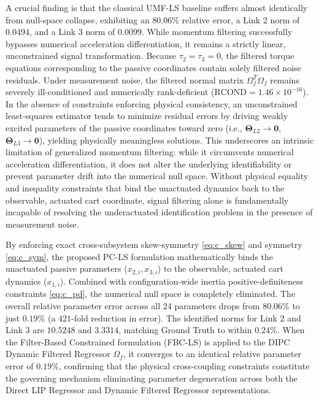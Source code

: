 \documentclass[lettersize,journal]{IEEEtran}
\begin{document}
A crucial finding is that the classical UMF-LS baseline \cite{GarciaAlarcon2012, AguilarSierra2014} suffers almost identically from null-space collapse, exhibiting an $80.06\%$ relative error, a Link 2 norm of $0.0494$, and a Link 3 norm of $0.0099$. While momentum filtering successfully bypasses numerical acceleration differentiation, it remains a strictly linear, unconstrained signal transformation. Because $\tau_2 = \tau_3 = 0$, the filtered torque equations corresponding to the passive coordinates contain solely filtered noise residuals. Under measurement noise, the filtered normal matrix $\Omega_f^T \Omega_f$ remains severely ill-conditioned and numerically rank-deficient ($\text{RCOND} = 1.46 \times 10^{-16}$). In the absence of constraints enforcing physical consistency, an unconstrained least-squares estimator tends to minimize residual errors by driving weakly excited parameters of the passive coordinates toward zero (i.e., $\bm{\Theta}_{L2} \to \mathbf{0}$, $\bm{\Theta}_{L3} \to \mathbf{0}$), yielding physically meaningless solutions. This underscores an intrinsic limitation of generalized momentum filtering: while it circumvents numerical acceleration differentiation, it does not alter the underlying identifiability or prevent parameter drift into the numerical null space. Without physical equality and inequality constraints that bind the unactuated dynamics back to the observable, actuated cart coordinate, signal filtering alone is fundamentally incapable of resolving the underactuated identification problem in the presence of measurement noise.

By enforcing exact cross-subsystem skew-symmetry \eqref{eq:c_skew} and symmetry \eqref{eq:c_sym}, the proposed PC-LS formulation mathematically binds the unactuated passive parameters ($x_{2,i}, x_{3,i}$) to the observable, actuated cart dynamics ($x_{1,i}$). Combined with configuration-wide inertia positive-definiteness constraints \eqref{eq:c_pd}, the numerical null space is completely eliminated. The overall relative parameter error across all 24 parameters drops from $80.06\%$ to just $0.19\%$ (a $421$-fold reduction in error). The identified norms for Link 2 and Link 3 are $10.5248$ and $3.3314$, matching Ground Truth to within $0.24\%$. When the Filter-Based Constrained formulation (FBC-LS) is applied to the DIPC Dynamic Filtered Regressor $\Omega_f$, it converges to an identical relative parameter error of $0.19\%$, confirming that the physical cross-coupling constraints constitute the governing mechanism eliminating parameter degeneration across both the Direct LIP Regressor and Dynamic Filtered Regressor representations.
\end{document}
